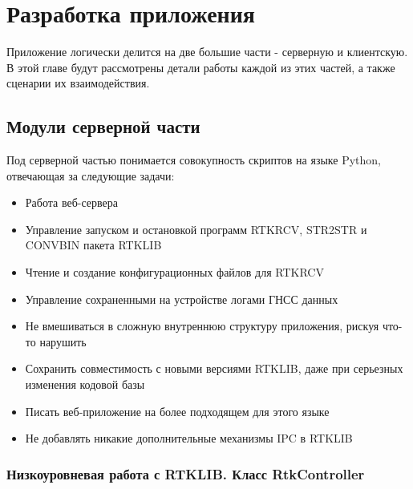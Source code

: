 \chapter{Разработка приложения} \label{chapt3}

Приложение логически делится на две большие части - серверную и клиентскую. В этой главе будут рассмотрены детали работы каждой из этих частей, а также сценарии их взаимодействия.

\section{Модули серверной части} \label{sect3_1}

Под серверной частью понимается совокупность скриптов на языке Python, отвечающая за следующие задачи:

\begin{itemize}
  \item Работа веб-сервера
  \item Управление запуском и остановкой программ RTKRCV, STR2STR и CONVBIN пакета RTKLIB
  \item Чтение и создание конфигурационных файлов для RTKRCV
  \item Управление сохраненными на устройстве логами ГНСС данных
\end{itemize}


\begin{itemize}
  \item Не вмешиваться в сложную внутреннюю структуру приложения, рискуя что-то нарушить
  \item Сохранить совместимость с новыми версиями RTKLIB, даже при серьезных изменения кодовой базы
  \item Писать веб-приложение на более подходящем для этого языке
  \item Не добавлять никакие дополнительные механизмы IPC в RTKLIB
\end{itemize}


\subsection{Низкоуровневая работа с RTKLIB. Класс RtkController} \label{subsect3_1_1}

